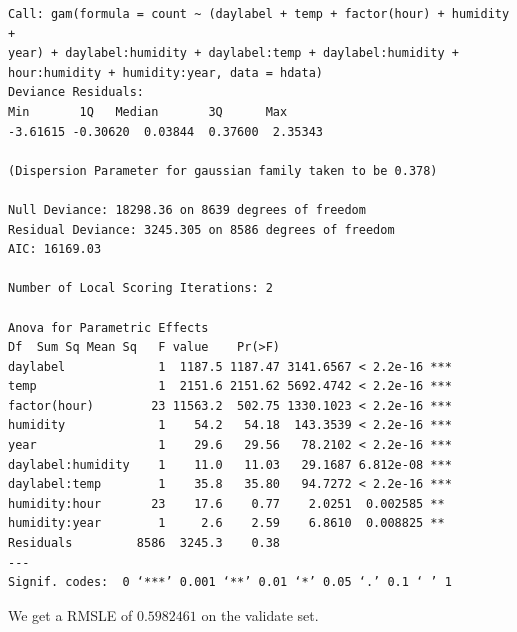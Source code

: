 \documentclass[12pt]{article}
\begin{document}
\begin{verbatim}
Call: gam(formula = count ~ (daylabel + temp + factor(hour) + humidity + 
year) + daylabel:humidity + daylabel:temp + daylabel:humidity + 
hour:humidity + humidity:year, data = hdata)
Deviance Residuals:
Min       1Q   Median       3Q      Max 
-3.61615 -0.30620  0.03844  0.37600  2.35343 

(Dispersion Parameter for gaussian family taken to be 0.378)

Null Deviance: 18298.36 on 8639 degrees of freedom
Residual Deviance: 3245.305 on 8586 degrees of freedom
AIC: 16169.03 

Number of Local Scoring Iterations: 2 

Anova for Parametric Effects
Df  Sum Sq Mean Sq   F value    Pr(>F)    
daylabel             1  1187.5 1187.47 3141.6567 < 2.2e-16 ***
temp                 1  2151.6 2151.62 5692.4742 < 2.2e-16 ***
factor(hour)        23 11563.2  502.75 1330.1023 < 2.2e-16 ***
humidity             1    54.2   54.18  143.3539 < 2.2e-16 ***
year                 1    29.6   29.56   78.2102 < 2.2e-16 ***
daylabel:humidity    1    11.0   11.03   29.1687 6.812e-08 ***
daylabel:temp        1    35.8   35.80   94.7272 < 2.2e-16 ***
humidity:hour       23    17.6    0.77    2.0251  0.002585 ** 
humidity:year        1     2.6    2.59    6.8610  0.008825 ** 
Residuals         8586  3245.3    0.38                        
---
Signif. codes:  0 ‘***’ 0.001 ‘**’ 0.01 ‘*’ 0.05 ‘.’ 0.1 ‘ ’ 1
\end{verbatim}

We get a RMSLE of $0.5982461$ on the validate set. \\
\end{document}
